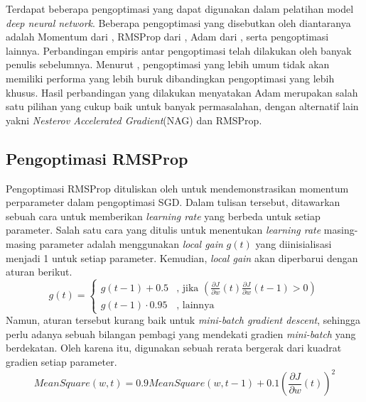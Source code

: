Terdapat beberapa pengoptimasi yang dapat digunakan dalam pelatihan model \emph{deep neural network}. Beberapa pengoptimasi yang disebutkan oleh \textcite{Ruder2016} diantaranya adalah Momentum dari \textcite{qian1999momentum}, RMSProp dari \textcite{hinton2012neural}, Adam dari \textcite{ADAMKingma}, serta pengoptimasi lainnya. Perbandingan empiris antar pengoptimasi telah dilakukan oleh banyak penulis sebelumnya. Menurut \textcite{Choi2019}, pengoptimasi yang lebih umum tidak akan memiliki performa yang lebih buruk dibandingkan pengoptimasi yang lebih khusus. Hasil perbandingan yang dilakukan \textcite{benchmark2021schmidt} menyatakan Adam merupakan salah satu pilihan yang cukup baik untuk banyak permasalahan, dengan alternatif lain yakni \emph{Nesterov Accelerated Gradient}(NAG) dan RMSProp.

\subsection{Pengoptimasi RMSProp}
Pengoptimasi RMSProp dituliskan oleh \textcite{hinton2012neural} untuk mendemonstrasikan momentum perparameter dalam pengoptimasi SGD. Dalam tulisan tersebut, ditawarkan sebuah cara untuk memberikan \emph{learning rate} yang berbeda untuk setiap parameter. Salah satu cara yang ditulis untuk menentukan \emph{learning rate} masing-masing parameter adalah menggunakan \emph{local gain} $g(t)$ yang diinisialisasi menjadi 1 untuk setiap parameter. Kemudian, \emph{local gain} akan diperbarui dengan aturan berikut.
\begin{equation*}
  g(t) =
  \begin{cases}
    g(t-1) + 0.5      & \text{, jika } \left(
    \frac{\partial J}{\partial w}(t) \frac{\partial J}{\partial w}(t-1) > 0
    \right)                                   \\
    g(t-1) \cdot 0.95 & \text{, lainnya}
  \end{cases}
\end{equation*}
Namun, aturan tersebut kurang baik untuk \emph{mini-batch gradient descent}, sehingga perlu adanya sebuah bilangan pembagi yang mendekati gradien \emph{mini-batch} yang berdekatan. Oleh karena itu, digunakan sebuah rerata bergerak dari kuadrat gradien setiap parameter.
$$
  MeanSquare(w, t) = 0.9 MeanSquare(w, t-1) + 0.1\left(\frac{\partial J}{\partial w}(t)\right)^2
$$

